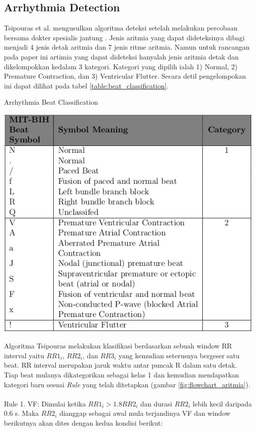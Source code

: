 \documentclass[]{indojc_single}
\begin{document}
\subsection{Arrhythmia Detection}
Tsipouras et al. mengusulkan algoritma deteksi setelah melakukan percobaan bersama dokter spesialis jantung \cite{tsipouras}. Jenis aritmia yang dapat dideteksinya dibagi menjadi 4 jenis detak aritmia dan 7 jenis ritme aritmia. Namun untuk rancangan pada paper ini artimia yang dapat dideteksi hanyalah jenis aritmia detak dan dikelompokkan kedalam 3 kategori. Kategori yang dipilih ialah 1) Normal, 2) Premature Contraction, dan 3) Ventricular Flutter. Secara detil pengelompokan ini dapat dilihat pada tabel \ref{table:beat_classification}.

\begin{table}[!h]
	\begin{center}
	\caption{Arrhythmia Beat Classification}
	\includegraphics[scale=0.35]{images/class.png}	
	\label{table:beat_classification}
	\end{center}
\end{table}

Algoritma Tsipouras melakukan klasifikasi berdasarkan sebuah window RR interval yaitu $RR1_i$, $RR2_i$, dan $RR3_i$ yang kemudian seterusnya bergeser satu beat. RR interval merupakan jaruk waktu antar puncak R dalam satu detak. Tiap beat mulanya dikategorikan sebagai kelas 1 dan kemudian mendapatkan kategori baru sesuai \textit{Rule} yang telah ditetapkan (gambar \ref{fig:flowchart_aritmia}).
\\
\\
Rule 1. VF: Dimulai ketika $RR1_i > 1.8RR2_i$ dan durasi $RR2_i$ lebih kecil daripada 0.6 s. Maka $RR2_i$ dianggap sebagai awal mula terjandinya VF dan window berikutnya akan dites dengan kedua kondisi berikut:
\end{document}

